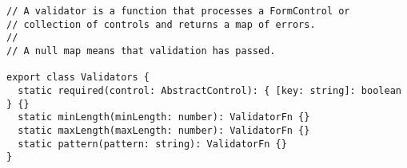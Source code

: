 \begin{verbatim}
// A validator is a function that processes a FormControl or
// collection of controls and returns a map of errors.
//
// A null map means that validation has passed.

export class Validators {
  static required(control: AbstractControl): { [key: string]: boolean } {}
  static minLength(minLength: number): ValidatorFn {}
  static maxLength(maxLength: number): ValidatorFn {}
  static pattern(pattern: string): ValidatorFn {}
}
\end{verbatim}
